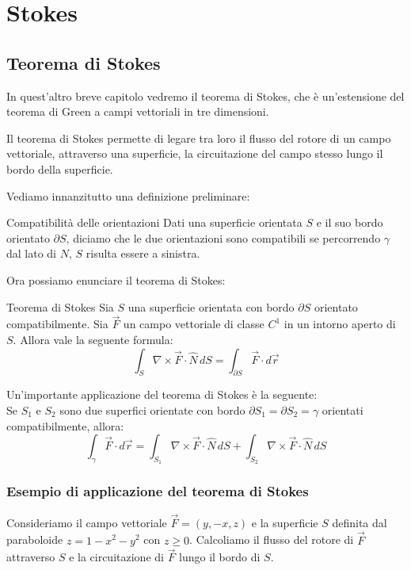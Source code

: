 \chapter{Stokes}
\section{Teorema di Stokes}
In quest'altro breve capitolo vedremo il teorema di Stokes, che è un'estensione del teorema di Green a campi vettoriali in tre dimensioni.

Il teorema di Stokes permette di legare tra loro il flusso del rotore di un campo vettoriale, attraverso una superficie, la circuitazione del campo stesso lungo il bordo della superficie.

Vediamo innanzitutto una definizione preliminare:\\


\begin{definizione}{Compatibilità delle orientazioni}
  Dati una superficie orientata $ S $ e il suo bordo orientato $\partial S $, diciamo che le due orientazioni sono compatibili se percorrendo $\gamma$ dal lato di $N$, $S$ risulta essere a sinistra.
\end{definizione}

Ora possiamo enunciare il teorema di Stokes:
\begin{teorema}{Teorema di Stokes}
    Sia $ S $ una superficie orientata con bordo $ \partial S $ orientato compatibilmente. Sia $ \vec{F} $ un campo vettoriale di classe $ C^1 $ in un intorno aperto di $ S $. Allora vale la seguente formula:
    \[
        \int_S \nabla \times \vec{F} \cdot \hat{N} \, dS = \int_{\partial S} \vec{F} \cdot d\vec{r}
    \]
\end{teorema}

Un'importante applicazione del teorema di Stokes è la seguente:\\
Se $S_1$ e $S_2$ sono due superfici orientate con bordo $\partial S_1=\partial S_2 =\gamma$ orientati compatibilmente, allora:
\[
    \int_{\gamma} \vec{F} \cdot d\vec{r}=
\int_{S_1} \nabla \times \vec{F} \cdot \hat{N} \, dS + \int_{S_2} \nabla \times \vec{F} \cdot \hat{N} \, dS
\]

\subsection{Esempio di applicazione del teorema di Stokes}

Consideriamo il campo vettoriale $\vec{F} = (y, -x, z)$ e la superficie $S$ definita dal paraboloide $z = 1 - x^2 - y^2$ con $z \geq 0$. Calcoliamo il flusso del rotore di $\vec{F}$ attraverso $S$ e la circuitazione di $\vec{F}$ lungo il bordo di $S$.

